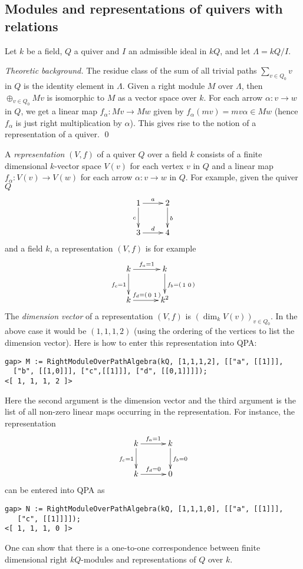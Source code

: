 \documentclass{amsart}
\renewcommand{\L}{\Lambda}
\theoremstyle{definition}
\theoremstyle{theoretic}
\newenvironment{theoback}
{\medskip\small\textit{Theoretic background.} }
{\qed\par\medskip}
\begin{document}
\subsection{Modules and representations of quivers with relations}

Let $k$ be a field, $Q$ a quiver and $I$ an admissible ideal in $kQ$,
and let $\L = kQ/I$.  

\begin{theoback}
The residue class of the sum of all trivial paths $\sum_{v\in Q_0} v$
in $Q$ is the identity element in $\L$.  Given a right module $M$ over
$\L$, then $\oplus_{v\in Q_0} Mv$ is isomorphic to $M$ as a vector
space over $k$.  For each arrow $\alpha\colon v\to w$ in $Q$, we get a
linear map $f_\alpha\colon Mv\to Mw$ given by $f_\alpha(mv) = mv\alpha
\in Mw$ (hence $f_\alpha$ is just right multiplication by $\alpha$).
This gives rise to the notion of a representation of a quiver.
\end{theoback}

A \emph{representation} $(V,f)$ of a quiver $Q$ over a field $k$
consists of a finite dimensional $k$-vector space $V(v)$ for each
vertex $v$ in $Q$ and a linear map $f_\alpha\colon V(v)\to V(w)$ for
each arrow $\alpha\colon v\to w$ in $Q$.  For example, given the
quiver $Q$
\[\xymatrix{
1\ar[r]^a\ar[d]_c & 2\ar[d]^b\\
3\ar[r]^d & 4
}\]
and a field $k$, a representation $(V,f)$ is for example 
\[\xymatrix@C=30pt{
k\ar[r]^{f_a = 1}\ar[d]_{f_c = 1} & k\ar[d]^{f_b
  = \left(\begin{smallmatrix} 1 & 0\end{smallmatrix}\right)}\\
k\ar[r]^{f_d = \left(\begin{smallmatrix} 0 & 1\end{smallmatrix}\right)} & k^2
}\]
The \emph{dimension vector} of a representation $(V,f)$ is $(\dim_k
V(v))_{v\in Q_0}$.  In the above case it would be $(1,1,1,2)$ (using
the ordering of the vertices to list the dimension vector).  Here is
how to enter this representation into QPA: 
\begin{verbatim}
gap> M := RightModuleOverPathAlgebra(kQ, [1,1,1,2], [["a", [[1]]], 
  ["b", [[1,0]]], ["c",[[1]]], ["d", [[0,1]]]]);
<[ 1, 1, 1, 2 ]>
\end{verbatim}
Here the second argument is the dimension vector and the third
argument is the list of all non-zero linear maps occurring in the
representation.  For instance, the representation 
\[\xymatrix@C=30pt{
k\ar[r]^{f_a = 1}\ar[d]_{f_c = 1} & k\ar[d]^{f_b  = 0}\\
k\ar[r]^{f_d = 0} & 0
}\]
can be entered into QPA as
\begin{verbatim}
gap> N := RightModuleOverPathAlgebra(kQ, [1,1,1,0], [["a", [[1]]], 
   ["c", [[1]]]]);
<[ 1, 1, 1, 0 ]>
\end{verbatim}
One can show that there is a one-to-one correspondence between finite
dimensional right $kQ$-modules and representations of $Q$ over $k$. 
\end{document}
